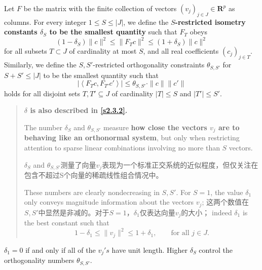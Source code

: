 \begin{definition}[\textbf{\textcolor[rgb]{1,0,0}{Restricted Isometry Constants}}]
    \label{def5.1.1}
    Let $F$ be the matrix with the finite collection of vectors $(v_j)_{j \in J}\in \mathbf{R}^p$ as columns. For every integer $1 \leq S \leq |J|$, we define the \textbf{\textcolor[rgb]{1,0,0}{$S$-restricted isometry constants $\delta_S$ to be the smallest quantity}} such that $F_T$ obeys
    \begin{equation}
        (1- \delta_S)\|c\|^2 \leq \|F_T c\|^2 \leq (1+\delta_S)\|c\|^2 
        \label{eq5.1.7}
    \end{equation}
    for all subsets $T \subset J$ of cardinality at most $S$, and all real coefficients $(c_j)_{j \in T}$. Similarly, we define the $S,S'$-restricted orthogonality constraints $\theta_{S,S'}$ for $S+S' \leq |J|$ to be the smallest quantity such that
    \begin{equation}
        |\left< F_T c, F_{T'} c' \right>| \leq \theta_{S,S'} \cdot \|c\| \|c'\|
        \label{eq5.1.8}
    \end{equation}
    holds for all disjoint sets $T,T' \subseteq J$ of cardinality $|T| \leq S$ and $|T'| \leq S'$.
\end{definition}

\begin{quote}
    \label{define:delta}

    \textbf{\textcolor[rgb]{1,0,0}{$\delta$ is also described in \cref{s2.3.2}.}}

    The number $\delta_S$ and $\theta_{S,S'}$ measure \textbf{\textcolor[rgb]{1,0,0}{how close the vectors $v_j$ are to behaving like an orthonormal system}}, but only when restricting attention to sparse linear combinations involving no more than $S$ vectors.

    $\delta_S$ and $\theta_{S,S'}$测量了向量$v_j$表现为一个标准正交系统的近似程度，但仅关注在包含不超过S个向量的稀疏线性组合情况中。

    These numbers are clearly nondecreasing in $S,S'$. For $S=1$, the value $\delta_1$ only conveys magnitude information about the vectors $v_j$; 
    这两个数值在$S,S'$中显然是非减的。对于$S=1$，$\delta_1$仅表达向量$v_j$的大小；
    indeed $\delta_1$ is the best constant such that
    \begin{equation}
        1-\delta_1 \leq \|v_j\|^2 \leq 1+\delta_1, \qquad \mbox{for all $j \in J$}.
        \label{eq5.1.9}
    \end{equation}
\end{quote}
$\delta_1 = 0$ if and only if all of the $v_j's$ have unit length. Higher $\delta_S$ control the orthogonality numbers $\theta_{S,S'}$.




